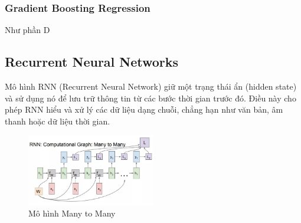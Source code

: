 \documentclass{ieeeojies}
\begin{document}
\subsubsection{Gradient Boosting Regression}
Như phần D

\subsection{Recurrent Neural Networks} 
Mô hình RNN (Recurrent Neural Network) giữ một trạng thái ẩn (hidden state) và sử dụng nó để lưu trữ thông tin từ các bước thời gian trước đó. Điều này cho phép RNN hiểu và xử lý các dữ liệu dạng chuỗi, chẳng hạn như văn bản, âm thanh hoặc dữ liệu thời gian.
\begin{figure}[h]
    \centering
    \includegraphics[width=0.5\textwidth]{bibliography/pictures/RNN.jpg}
    \caption{Mô hình Many to Many}
\end{figure}
\end{document}
